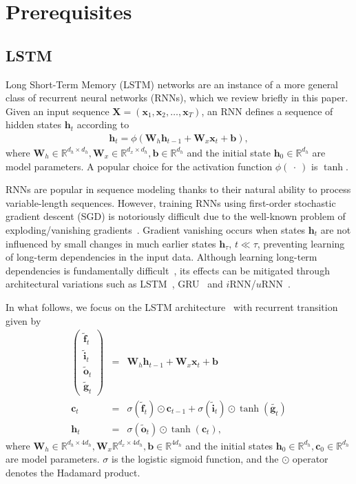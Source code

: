 \documentclass{article} \pdfoutput=1 \usepackage[utf8]{inputenc}
\newcommand{\vect}[1]{\mathbf{#1}}
\newcommand{\mat}[1]{\mathbf{#1}}
\newcommand{\ewprod}{\odot}
\newcommand{\reals}{\mathbb{R}}
\begin{document}
\section{Prerequisites}
\label{sec:prerequisites}

\subsection{LSTM}

Long Short-Term Memory (LSTM) networks are an instance of a more general class of recurrent neural
networks (RNNs), which we review briefly in this paper.  Given an input sequence $\mat{X} = ( \vect{x}_1,
\vect{x}_2, \ldots, \vect{x}_T )$, an RNN defines a sequence of hidden states $\vect{h}_t$
according to
\begin{eqnarray}
  \vect{h}_t = \phi(\mat{W}_h \vect{h}_{t-1} + \mat{W}_x  \vect{x}_t + \vect{b}),
\end{eqnarray}
where $\mat{W}_h \in \reals^{d_h \times d_h}, \mat{W}_x \in \reals^{d_x \times d_h}, \vect{b} \in \reals^{d_h}$
and the initial state $\vect{h}_0 \in \reals^{d_h}$ are model parameters.
A popular choice for the activation function $\phi(\ \cdot\ )$ is $\tanh$.

RNNs are popular in sequence modeling thanks to their natural ability to process variable-length sequences.
However, training RNNs using first-order stochastic gradient descent (SGD) is notoriously difficult
due to the well-known problem of exploding/vanishing gradients~\citep{bengio1994learning,hochreiter1991untersuchungen,pascanudifficulty}.
Gradient vanishing occurs when states $\vect{h}_t$ are not influenced by small changes in much earlier states $\vect{h}_{\tau}$, $t \ll \tau$,
preventing learning of long-term dependencies in the input data.
Although learning long-term dependencies is fundamentally difficult~\citep{bengio1994learning},
its effects can be mitigated through architectural variations such as LSTM~\citep{lstm}, GRU~\citep{cho2014learning} and $i$RNN/$u$RNN~\citep{le2015simple,urnn}.

In what follows, we focus on the LSTM architecture~\citep{lstm} with recurrent transition given by
\begin{eqnarray}
\left(\begin{array}{ccc}
\tilde{\vect{f}}_t \\
\tilde{\vect{i}}_t \\
\tilde{\vect{o}}_t \\
\tilde{\vect{g}}_t
\end{array}\right)
 &=&
 \mat{W}_h \vect{h}_{t-1} +
 \mat{W}_x \vect{x}_t +
 \vect{b}
 \\
\vect{c}_t &= &\sigma(\tilde{\vect{f}}_t) \ewprod \vect{c}_{t-1} +
\sigma(\tilde{\vect{i}}_t) \ewprod \tanh(\tilde{\vect{g}_t}) \\
\vect{h}_t &= &\sigma(\tilde{\vect{o}}_t) \ewprod \tanh(\vect{c}_t),
\end{eqnarray}
where $\vect{W}_h \in \reals^{d_h \times 4 d_h}, \vect{W}_x \reals^{d_x \times 4 d_h}, \vect{b} \in \reals^{4 d_h}$
and the initial states $\vect{h}_0 \in \reals^{d_h}, \vect{c}_0 \in \reals^{d_h}$ are model parameters.
$\sigma$ is the logistic sigmoid function, and the $\ewprod$ operator denotes the Hadamard product.
\end{document}
